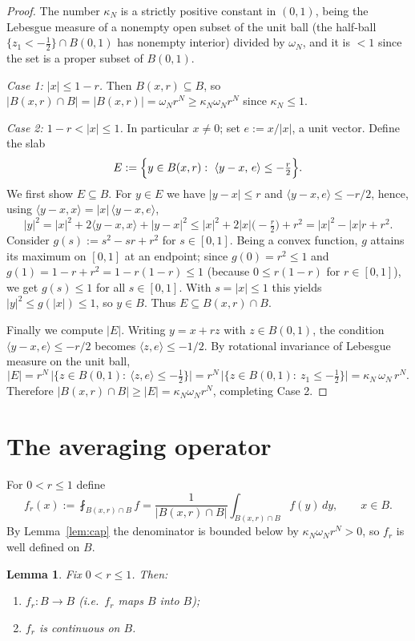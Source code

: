 \documentclass{amsart}
\newtheorem{lemma}{Lemma}
\theoremstyle{definition}
\begin{document}
\begin{proof}
The number $\kappa_N$ is a strictly positive constant in $(0,1)$, being the
Lebesgue measure of a nonempty open subset of the unit ball (the half-ball
$\{z_1<-\tfrac12\}\cap B(0,1)$ has nonempty interior) divided by $\omega_N$, and it
is $<1$ since the set is a proper subset of $B(0,1)$.

\emph{Case 1: $|x|\le 1-r$.} Then $B(x,r)\subseteq B$, so
$|B(x,r)\cap B|=|B(x,r)|=\omega_N r^N\ge\kappa_N\omega_N r^N$ since $\kappa_N\le1$.

\emph{Case 2: $1-r<|x|\le 1$.} In particular $x\ne0$; set $e:=x/|x|$, a unit
vector. Define the slab
\[
E:=\Bigl\{y\in B(x,r):\ \langle y-x,\,e\rangle\le -\tfrac{r}{2}\Bigr\}.
\]
We first show $E\subseteq B$. For $y\in E$ we have $|y-x|\le r$ and
$\langle y-x,e\rangle\le -r/2$, hence, using $\langle y-x,x\rangle=|x|\,\langle
y-x,e\rangle$,
\[
|y|^2=|x|^2+2\langle y-x,x\rangle+|y-x|^2
\le |x|^2+2|x|\bigl(-\tfrac r2\bigr)+r^2
=|x|^2-|x|r+r^2 .
\]
Consider $g(s):=s^2-sr+r^2$ for $s\in[0,1]$. Being a convex function, $g$ attains
its maximum on $[0,1]$ at an endpoint; since $g(0)=r^2\le1$ and
$g(1)=1-r+r^2=1-r(1-r)\le1$ (because $0\le r(1-r)$ for $r\in[0,1]$), we get
$g(s)\le1$ for all $s\in[0,1]$. With $s=|x|\le1$ this yields $|y|^2\le g(|x|)\le1$,
so $y\in B$. Thus $E\subseteq B(x,r)\cap B$.

Finally we compute $|E|$. Writing $y=x+rz$ with $z\in B(0,1)$, the condition
$\langle y-x,e\rangle\le -r/2$ becomes $\langle z,e\rangle\le -1/2$. By rotational
invariance of Lebesgue measure on the unit ball,
\[
|E|=r^N\,\bigl|\{z\in B(0,1):\ \langle z,e\rangle\le -\tfrac12\}\bigr|
   =r^N\,\bigl|\{z\in B(0,1):\ z_1\le -\tfrac12\}\bigr|
   =\kappa_N\,\omega_N\,r^N .
\]
Therefore $|B(x,r)\cap B|\ge|E|=\kappa_N\omega_N r^N$, completing Case 2.
\end{proof}

\section{The averaging operator}

For $0<r\le1$ define
\begin{equation}\label{eq:fr}
f_r(x):=\fint_{B(x,r)\cap B} f
       =\frac{1}{|B(x,r)\cap B|}\int_{B(x,r)\cap B}f(y)\,dy,\qquad x\in B.
\end{equation}
By Lemma~\ref{lem:cap} the denominator is bounded below by $\kappa_N\omega_N r^N>0$,
so $f_r$ is well defined on $B$.

\begin{lemma}\label{lem:basic}
Fix $0<r\le1$. Then:
\begin{enumerate}
\item[(a)] $f_r:B\to B$ (i.e.\ $f_r$ maps $B$ into $B$);
\item[(b)] $f_r$ is continuous on $B$.
\end{enumerate}
\end{lemma}
\end{document}
